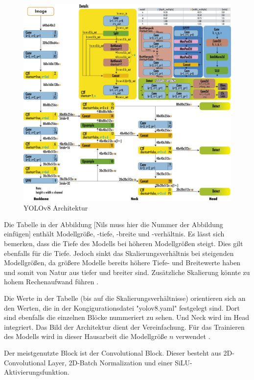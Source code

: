 \documentclass[a4paper,12pt]{article}
\begin{document}
\FloatBarrier
\begin{figure}[h]
    \centering
    \includegraphics[width=\textwidth]{Bild6.png}
    \caption{YOLOv8 Architektur}
    \label{fig:bild6}
\end{figure}
\FloatBarrier

\noindent Die Tabelle in der Abbildung [Nils muss hier die Nummer der Abbildung einfügen] enthält Modellgröße, -tiefe, -breite und -verhältnis. Es lässt sich bemerken, dass die Tiefe des Modells bei höheren Modellgrößen steigt. Dies gilt ebenfalls für die Tiefe. Jedoch sinkt das Skalierungsverhältnis bei steigenden Modellgrößen, da größere Modelle bereits höhere Tiefe- und Breitewerte haben und somit von Natur aus tiefer und breiter sind. Zusätzliche Skalierung könnte zu hohem Rechenaufwand führen \cite{terven2023comprehensive}.


\noindent Die Werte in der Tabelle (bis auf die Skalierungsverhältnisse) orientieren sich an den Werten, die in der Kongigurationsdatei "yolov8.yaml" festgelegt sind. Dort sind ebenfalls die einzelnen Blöcke nummeriert zu sehen. Und Neck wird im Head integriert. Das Bild der Architektur dient der Vereinfachung. Für das Trainieren des Modells wird in dieser Hausarbeit die Modellgröße $n$ verwendet \cite{ultralytics_yolov8}. %

\noindent Der meistgenutzte Block ist der Convolutional Block. Dieser besteht aus 2D-Convolutional Layer, 2D-Batch Normalization und einer SiLU-Aktivierungsfunktion. 
\end{document}
